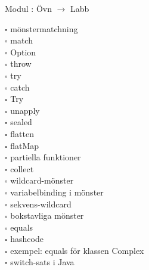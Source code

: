
    Modul : Övn  $\rightarrow$ Labb 
    \begin{multicols}{3}\SlideFontTiny
    $\square$ mönstermatchning \\
$\square$ match \\
$\square$ Option \\
$\square$ throw \\
$\square$ try \\
$\square$ catch \\
$\square$ Try \\
$\square$ unapply \\
$\square$ sealed \\
$\square$ flatten \\
$\square$ flatMap \\
$\square$ partiella funktioner \\
$\square$ collect \\
$\square$ wildcard-mönster \\
$\square$ variabelbinding i mönster \\
$\square$ sekvens-wildcard \\
$\square$ bokstavliga mönster \\
$\square$ equals \\
$\square$ hashcode \\
$\square$ exempel: equals för klassen Complex \\
$\square$ switch-sats i Java \\
    \end{multicols}
    